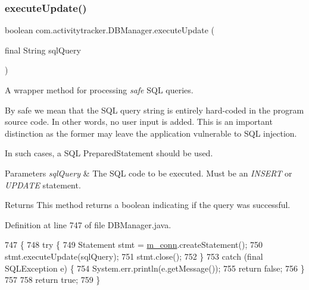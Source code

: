 \subsubsection{\texorpdfstring{execute\+Update()}{executeUpdate()}}
{\footnotesize\ttfamily boolean com.\+activitytracker.\+D\+B\+Manager.\+execute\+Update (\begin{DoxyParamCaption}\item[{final String}]{sql\+Query }\end{DoxyParamCaption})\hspace{0.3cm}{\ttfamily [private]}}

A wrapper method for processing {\itshape safe} S\+QL queries.

By safe we mean that the S\+QL query string is entirely hard-\/coded in the program source code. In other words, no user input is added. This is an important distinction as the former may leave the application vulnerable to S\+QL injection.

In such cases, a S\+QL Prepared\+Statement should be used.


\begin{DoxyParams}{Parameters}
{\em sql\+Query} & The S\+QL code to be executed. Must be an {\itshape I\+N\+S\+E\+RT} or {\itshape U\+P\+D\+A\+TE} statement.\\
\hline
\end{DoxyParams}
\begin{DoxyReturn}{Returns}
This method returns a boolean indicating if the query was successful. 
\end{DoxyReturn}


Definition at line 747 of file D\+B\+Manager.\+java.


\begin{DoxyCode}
747                                                          \{
748         \textcolor{keywordflow}{try} \{
749             Statement stmt = \mbox{\hyperlink{classcom_1_1activitytracker_1_1_d_b_manager_a064088d13ac09eb147fdc19268771521}{m\_conn}}.createStatement();
750             stmt.executeUpdate(sqlQuery);
751             stmt.close();
752         \}
753         \textcolor{keywordflow}{catch} (\textcolor{keyword}{final} SQLException e) \{
754             System.err.println(e.getMessage());
755             \textcolor{keywordflow}{return} \textcolor{keyword}{false};
756         \}
757 
758         \textcolor{keywordflow}{return} \textcolor{keyword}{true};
759     \}
\end{DoxyCode}
\mbox{\label{classcom_1_1activitytracker_1_1_d_b_manager_a0576baf67b45c7d2d0ba369052e4404e}} 
